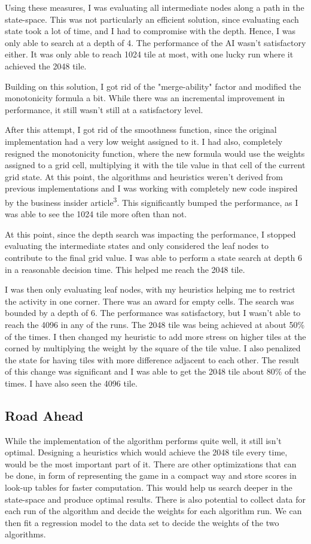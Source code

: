 \documentclass[english]{article}
\begin{document}
Using these measures, I was evaluating all intermediate nodes along a path in the state-space. This was not particularly an efficient solution, since evaluating each state took a lot of time, and I had to compromise with the depth. Hence, I was only able to search at a depth of 4. The performance of the AI wasn't satisfactory either. It was only able to reach 1024 tile at most, with one  lucky run where it achieved the 2048 tile.

Building on this solution, I got rid of the "merge-ability" factor and modified the monotonicity formula a bit. While there was an incremental improvement in performance, it still wasn't still at a satisfactory level.

After this attempt, I got rid of the smoothness function, since the original implementation had a very low weight assigned to it. I had also, completely resigned the monotonicity function, where the new formula would use the weights assigned to a grid cell, multiplying it with the tile value in that cell of the current grid state. At this point, the algorithms and heuristics weren't derived from previous implementations and I was working with completely new code inspired by the business insider article\textsuperscript{3}. This significantly bumped the performance, as I was able to see the 1024 tile more often than not.

At this point, since the depth search was impacting the performance, I stopped evaluating the intermediate states and only considered the leaf nodes to contribute to the final grid value. I was able to perform a state search at depth 6 in a reasonable decision time. This helped me reach the 2048 tile.

I was then only evaluating leaf nodes, with my heuristics helping me to restrict the activity in one corner. There was an award for empty cells. The search was bounded by a depth of 6. The performance was satisfactory, but I wasn't able to reach the 4096 in any of the runs. The 2048 tile was being achieved at about 50\% of the times. I then changed my heuristic to add more stress on higher tiles at the corned by multiplying the weight by the square of the tile value. I also penalized the state for having tiles with more difference adjacent to each other. The result of this change was significant and I was able to get the 2048 tile about 80\% of the times. I have also seen the 4096 tile.

\subsection*{Road Ahead}
While the implementation of the algorithm performs quite well, it still isn't optimal. Designing a heuristics which would achieve the 2048 tile every time, would be the most important part of it. There are other optimizations that can be done, in form of representing the game in a compact way and store scores in look-up tables for faster computation. This would help us search deeper in the state-space and produce optimal results. There is also potential to collect data for each run of the algorithm and decide the weights for each algorithm run. We can then fit a regression model to the data set to decide the weights of the two algorithms.
\end{document}
